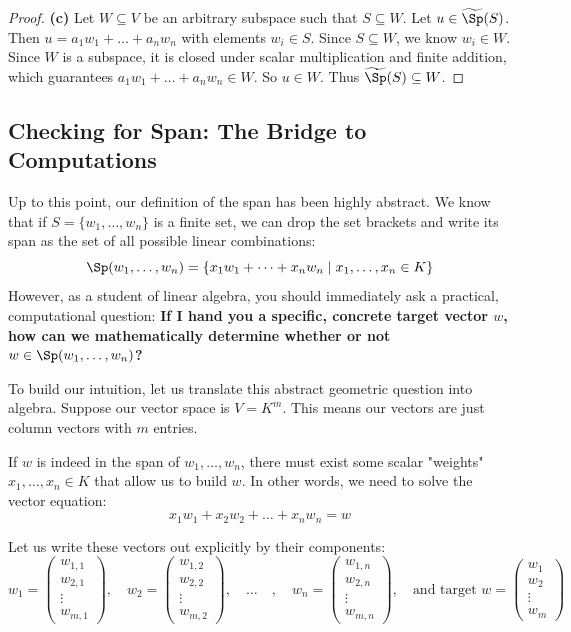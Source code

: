 \begin{proof}
\textbf{(c)} Let $W \subseteq V$ be an arbitrary subspace such that $S \subseteq W$. Let $u \in \widetilde{\Sp}(S)$. Then $u = a_1 w_1 + \dots + a_n w_n$ with elements $w_i \in S$. Since $S \subseteq W$, we know $w_i \in W$. Since $W$ is a subspace, it is closed under scalar multiplication and finite addition, which guarantees $a_1 w_1 + \dots + a_n w_n \in W$. So $u \in W$. Thus $\widetilde{\Sp}(S) \subseteq W$.
\end{proof}

\subsection{Checking for Span: The Bridge to Computations}

Up to this point, our definition of the span has been highly abstract. We know that if $S = \{w_1, \dots, w_n\}$ is a finite set, we can drop the set brackets and write its span as the set of all possible linear combinations:
\[
\Sp(w_1, \dots, w_n) = \{x_1 w_1 + \dots + x_n w_n \mid x_1, \dots, x_n \in K\}
\]
However, as a student of linear algebra, you should immediately ask a practical, computational question: \textbf{If I hand you a specific, concrete target vector $w$, how can we mathematically determine whether or not $w \in \Sp(w_1, \dots, w_n)$?}

To build our intuition, let us translate this abstract geometric question into algebra. Suppose our vector space is $V = K^m$. This means our vectors are just column vectors with $m$ entries. 

If $w$ is indeed in the span of $w_1, \dots, w_n$, there must exist some scalar "weights" $x_1, \dots, x_n \in K$ that allow us to build $w$. In other words, we need to solve the vector equation:
\begin{equation} \label{eq:vector_combo}
x_1 w_1 + x_2 w_2 + \dots + x_n w_n = w
\end{equation}

Let us write these vectors out explicitly by their components:
\[
w_1 = \begin{pmatrix} w_{1,1} \\ w_{2,1} \\ \vdots \\ w_{m,1} \end{pmatrix}, \quad w_2 = \begin{pmatrix} w_{1,2} \\ w_{2,2} \\ \vdots \\ w_{m,2} \end{pmatrix}, \quad \dots \quad , \quad w_n = \begin{pmatrix} w_{1,n} \\ w_{2,n} \\ \vdots \\ w_{m,n} \end{pmatrix}, \quad \text{and target } w = \begin{pmatrix} w_1 \\ w_2 \\ \vdots \\ w_m \end{pmatrix}
\]

